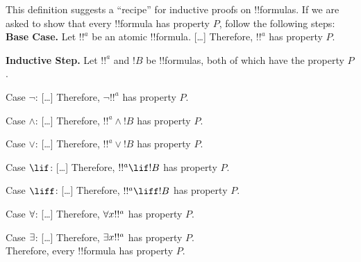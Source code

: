 \documentclass[../../include/open-logic-section]{subfiles}
\begin{document}
\begin{explain}
This definition suggests a ``recipe'' for inductive proofs on
!!{formula}s. If we are asked to show that every !!{formula} has
property $P$, follow the following steps:\\

\textbf{Base Case.} Let $!!^a$ be an atomic !!{formula}. [\ldots]
Therefore, $!!^a$ has property $P$.

\textbf{Inductive Step.} Let $!!^a$ and $!B$ be !!{formula}s, both of
which have the property $P$.

Case $\lnot$: [\ldots] Therefore, $\lnot !!^a$ has property $P$.

Case $\land$: [\ldots] Therefore, $!!^a \land !B$ has property $P$.

Case $\lor$: [\ldots] Therefore, $!!^a \lor !B$ has property $P$.

Case $\lif$: [\ldots] Therefore, $!!^a \lif !B$ has property $P$.

Case $\liff$: [\ldots] Therefore, $!!^a \liff !B$ has property $P$.

Case $\lforall[]$: [\ldots] Therefore, $\lforall[x] !!^a$ has property $P$.

Case $\lexists[]$: [\ldots] Therefore, $\lexists[x] !!^a$ has property $P$. \\

Therefore, every !!{formula} has property $P$.
\end{explain}
\end{document}
